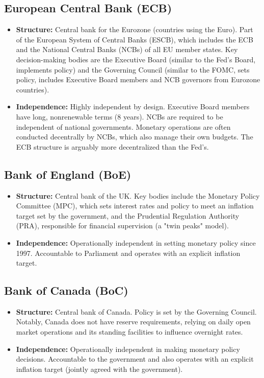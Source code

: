 \subsection{European Central Bank (ECB)}
\begin{itemize}
    \item \textbf{Structure:} Central bank for the Eurozone (countries using the Euro). Part of the European System of Central Banks (ESCB), which includes the ECB and the National Central Banks (NCBs) of all EU member states. Key decision-making bodies are the Executive Board (similar to the Fed's Board, implements policy) and the Governing Council (similar to the FOMC, sets policy, includes Executive Board members and NCB governors from Eurozone countries).
    \item \textbf{Independence:} Highly independent by design. Executive Board members have long, nonrenewable terms (8 years). NCBs are required to be independent of national governments. Monetary operations are often conducted decentrally by NCBs, which also manage their own budgets. The ECB structure is arguably more decentralized than the Fed's.
\end{itemize}

\subsection{Bank of England (BoE)}
\begin{itemize}
    \item \textbf{Structure:} Central bank of the UK. Key bodies include the Monetary Policy Committee (MPC), which sets interest rates and policy to meet an inflation target set by the government, and the Prudential Regulation Authority (PRA), responsible for financial supervision (a "twin peaks" model).
    \item \textbf{Independence:} Operationally independent in setting monetary policy since 1997. Accountable to Parliament and operates with an explicit inflation target.
\end{itemize}

\subsection{Bank of Canada (BoC)}
\begin{itemize}
    \item \textbf{Structure:} Central bank of Canada. Policy is set by the Governing Council. Notably, Canada does not have reserve requirements, relying on daily open market operations and its standing facilities to influence overnight rates.
    \item \textbf{Independence:} Operationally independent in making monetary policy decisions. Accountable to the government and also operates with an explicit inflation target (jointly agreed with the government).
\end{itemize}

